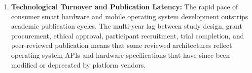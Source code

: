 \begin{enumerate}[label=\textbf{\arabic*.}]
    \item \textbf{Technological Turnover and Publication Latency:} The rapid pace of consumer smart hardware and mobile operating system development outstrips academic publication cycles. The multi-year lag between study design, grant procurement, ethical approval, participant recruitment, trial completion, and peer-reviewed publication means that some reviewed architectures reflect operating system APIs and hardware specifications that have since been modified or deprecated by platform vendors.
\end{enumerate}